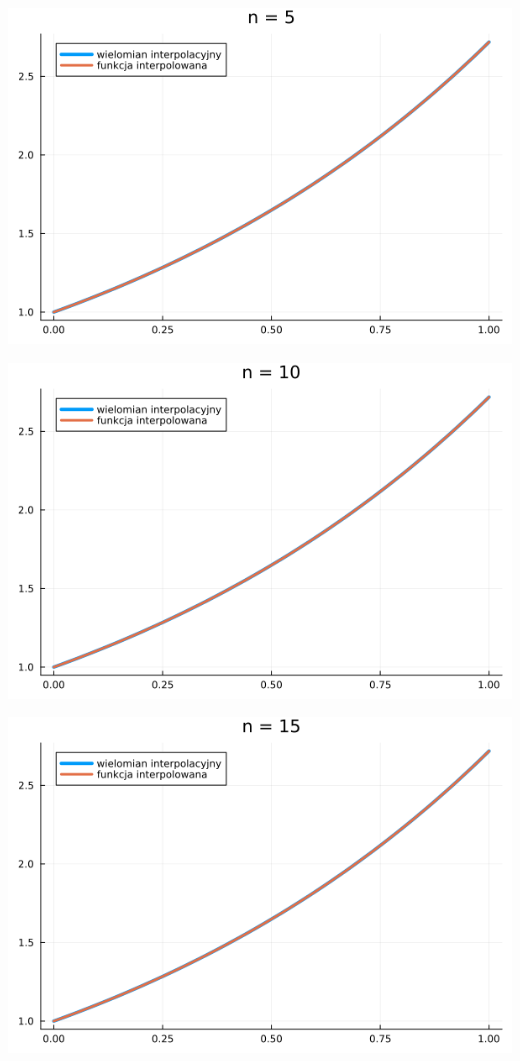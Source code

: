 \documentclass{article}
\begin{document}
\begin{center}
    \includegraphics[scale=0.4]{5a_5.png}
\end{center}
\begin{center}
    \includegraphics[scale=0.4]{5a_10.png}
\end{center}
\begin{center}
    \includegraphics[scale=0.4]{5a_15.png}
\end{center}
\end{document}

